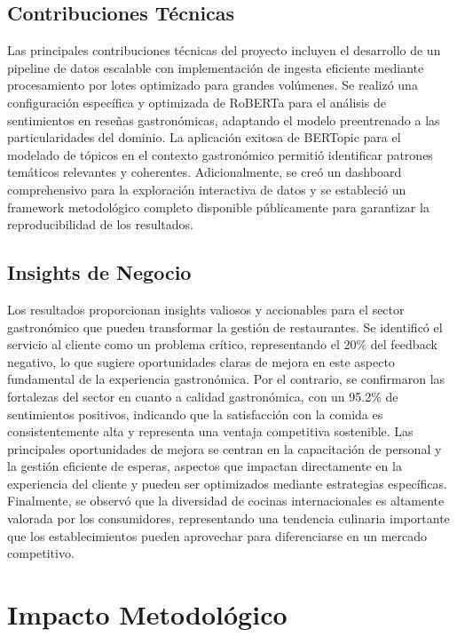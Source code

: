 \documentclass[12pt,a4paper,twoside,openany]{book}
\begin{document}
\subsection{Contribuciones Técnicas}

Las principales contribuciones técnicas del proyecto incluyen el desarrollo de un pipeline de datos escalable con implementación de ingesta eficiente mediante procesamiento por lotes optimizado para grandes volúmenes. Se realizó una configuración específica y optimizada de RoBERTa para el análisis de sentimientos en reseñas gastronómicas, adaptando el modelo preentrenado a las particularidades del dominio. La aplicación exitosa de BERTopic para el modelado de tópicos en el contexto gastronómico permitió identificar patrones temáticos relevantes y coherentes. Adicionalmente, se creó un dashboard comprehensivo para la exploración interactiva de datos y se estableció un framework metodológico completo disponible públicamente para garantizar la reproducibilidad de los resultados.

\subsection{Insights de Negocio}

Los resultados proporcionan insights valiosos y accionables para el sector gastronómico que pueden transformar la gestión de restaurantes. Se identificó el servicio al cliente como un problema crítico, representando el 20\% del feedback negativo, lo que sugiere oportunidades claras de mejora en este aspecto fundamental de la experiencia gastronómica. Por el contrario, se confirmaron las fortalezas del sector en cuanto a calidad gastronómica, con un 95.2\% de sentimientos positivos, indicando que la satisfacción con la comida es consistentemente alta y representa una ventaja competitiva sostenible. Las principales oportunidades de mejora se centran en la capacitación de personal y la gestión eficiente de esperas, aspectos que impactan directamente en la experiencia del cliente y pueden ser optimizados mediante estrategias específicas. Finalmente, se observó que la diversidad de cocinas internacionales es altamente valorada por los consumidores, representando una tendencia culinaria importante que los establecimientos pueden aprovechar para diferenciarse en un mercado competitivo.

\section{Impacto Metodológico}
\end{document}
